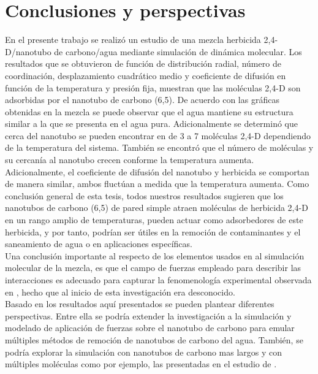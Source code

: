 \chapter{Conclusiones y perspectivas}

En el presente trabajo se realizó un estudio de una mezcla herbicida 2,4-D/nanotubo de carbono/agua mediante simulación de dinámica molecular. Los resultados que se obtuvieron de función de distribución radial, número de coordinación, desplazamiento cuadrático medio y coeficiente de difusión en función de la temperatura y presión fija, muestran que las moléculas 2,4-D son adsorbidas por el nanotubo de carbono (6,5). De acuerdo con las gráficas obtenidas en la mezcla se puede observar que el agua mantiene su estructura similar a la que se presenta en el agua pura. Adicionalmente se determinó que cerca del nanotubo se pueden encontrar en de 3 a 7 moléculas 2,4-D dependiendo de la temperatura del sistema. También se encontró que el número de moléculas y su cercanía al nanotubo crecen conforme la temperatura aumenta.\\

Adicionalmente, el coeficiente de difusión del nanotubo y herbicida se comportan de manera similar, ambos fluctúan a medida que la temperatura aumenta. Como conclusión general de esta tesis, todos nuestros resultados sugieren que los nanotubos de carbono (6,5) de pared simple atraen moléculas de herbicida 2,4-D en un rango amplio de temperaturas, pueden actuar como adsorbedores de este herbicida, y por tanto, podrían ser útiles en la remoción de contaminantes y el saneamiento de agua o en aplicaciones específicas.\\

Una conclusión importante al respecto de los elementos usados en al simulación molecular de la mezcla, es que el campo de fuerzas empleado para describir las interacciones es adecuado para capturar la fenomenología experimental observada en \cite{rocha2017}, hecho que al inicio de esta investigación era desconocido.\\

Basado en los resultados aquí presentados se pueden plantear diferentes perspectivas. Entre ella se podría extender la investigación a la simulación y modelado de aplicación de fuerzas sobre el nanotubo de carbono para emular múltiples métodos de remoción de nanotubos de carbono del agua. También, se podría explorar la simulación con nanotubos de carbono mas largos y con múltiples moléculas como por ejemplo, las presentadas en el estudio de \cite{rocha2017}.